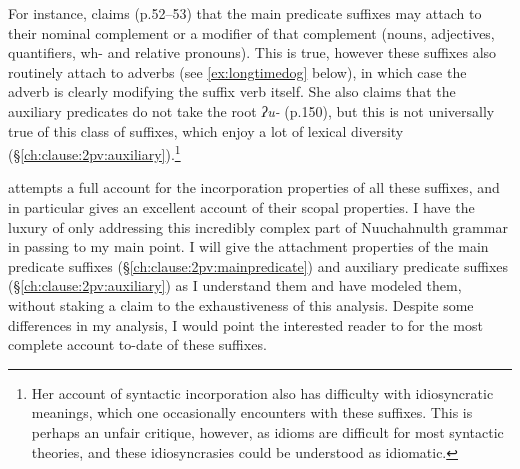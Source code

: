 For instance, \citeauthor{wojdak2005} claims (p.52--53) that the main predicate suffixes may attach to their nominal complement or a modifier of that complement (nouns, adjectives, quantifiers, wh- and relative pronouns). This is true, however these suffixes also routinely attach to adverbs (see \ref{ex:longtimedog} below), in which case the adverb is clearly modifying the suffix verb itself. %
She also claims that the auxiliary predicates do not take the root \textit{ʔu-} (p.150), but this is not universally true of this class of suffixes, which enjoy a lot of lexical diversity (\S\ref{ch:clause:2pv:auxiliary}).\footnote{Her account of syntactic incorporation also has difficulty with idiosyncratic meanings, which one occasionally encounters with these suffixes. This is perhaps an unfair critique, however, as idioms are difficult for most syntactic theories, and these idiosyncrasies could be understood as idiomatic.}

\citeauthor{wojdak2005} attempts a full account for the incorporation properties of all these suffixes, and in particular gives an excellent account of their scopal properties. I have the luxury of only addressing this incredibly complex part of Nuuchahnulth grammar in passing to my main point. I will give the attachment properties of the main predicate suffixes (\S\ref{ch:clause:2pv:mainpredicate}) and auxiliary predicate suffixes (\S\ref{ch:clause:2pv:auxiliary}) as I understand them and have modeled them, without staking a claim to the exhaustiveness of this analysis. Despite some differences in my analysis, I would point the interested reader to \citet{wojdak2005} for the most complete account to-date of these suffixes.


